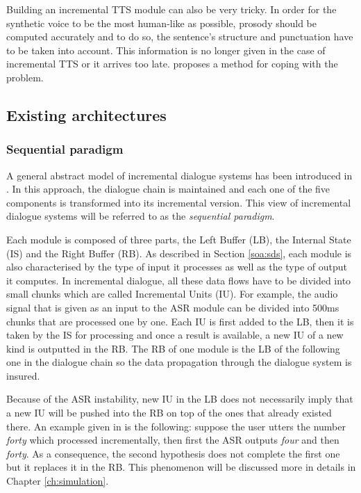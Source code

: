 		Building an incremental TTS module can also be very tricky. In order for the synthetic voice to be the most human-like as possible, prosody should be computed accurately and to do so, the sentence's structure and punctuation have to be taken into account. This information is no longer given in the case of incremental TTS or it arrives too late. \cite{Baumann2014} proposes a method for coping with the problem. 


	\subsection{Existing architectures}
		\subsubsection{Sequential paradigm}
			
			A general abstract model of incremental dialogue systems has been introduced in \cite{Schlangen2011}. In this approach, the dialogue chain is maintained and each one of the five components is transformed into its incremental version. This view of incremental dialogue systems will be referred to as the \textit{sequential paradigm}.
				
			Each module is composed of three parts, the Left Buffer (LB), the Internal State (IS) and the Right Buffer (RB). As described in Section \ref{soa:sds}, each module is also characterised by the type of input it processes as well as the type of output it computes. In incremental dialogue, all these data flows have to be divided into small chunks which are called Incremental Units (IU). For example, the audio signal that is given as an input to the ASR module can be divided into 500ms chunks that are processed one by one. Each IU is first added to the LB, then it is taken by the IS for processing and once a result is available, a new IU of a new kind is outputted in the RB. The RB of one module is the LB of the following one in the dialogue chain so the data propagation through the dialogue system is insured.
			
			Because of the ASR instability, new IU in the LB does not necessarily imply that a new IU will be pushed into the RB on top of the ones that already existed there. An example given in \cite{Schlangen2011} is the following: suppose the user utters the number \textit{forty} which processed incrementally, then first the ASR outputs \textit{four} and then \textit{forty}. As a consequence, the second hypothesis does not complete the first one but it replaces it in the RB. This phenomenon will be discussed more in details in Chapter \ref{ch:simulation}.
			
